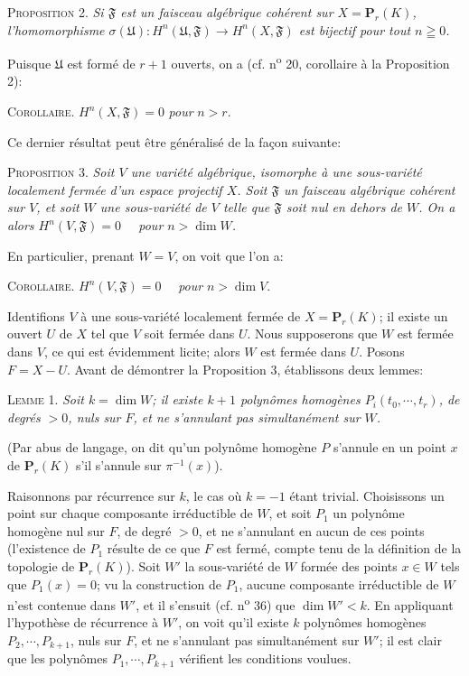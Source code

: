\textsc{Proposition} 2. \textit{Si $\mathfrak{F}$ est un faisceau algébrique cohérent sur $X = \mathbf{P}_r(K)$, l'homomorphisme $\sigma(\mathfrak{U}) : H^n(\mathfrak{U}, \mathfrak{F}) \to H^n(X, \mathfrak{F})$ est bijectif pour tout $n \geqq 0$.}

Puisque $\mathfrak{U}$ est formé de $r + 1$ ouverts, on a (cf. n\textsuperscript{o} 20, corollaire à la Proposition 2):

\textsc{Corollaire}. $H^n(X, \mathfrak{F}) = 0$ \textit{pour} $n > r$.

Ce dernier résultat peut être généralisé de la façon suivante:

\textsc{Proposition} 3. \textit{Soit $V$ une variété algébrique, isomorphe à une sous-variété localement fermée d'un espace projectif $X$. Soit $\mathfrak{F}$ un faisceau algébrique cohérent sur $V$, et soit $W$ une sous-variété de $V$ telle que $\mathfrak{F}$ soit nul en dehors de $W$. On a alors $H^n(V, \mathfrak{F}) = 0$ \ \ pour $n > \dim W$.}

En particulier, prenant $W = V$, on voit que l'on a:

\textsc{Corollaire}. $H^n(V, \mathfrak{F}) = 0$ \ \ \textit{pour} $n > \dim V$.

Identifions $V$ à une sous-variété localement fermée de $X = \mathbf{P}_r(K)$; il existe un ouvert $U$ de $X$ tel que $V$ soit fermée dans $U$. Nous supposerons que $W$ est fermée dans $V$, ce qui est évidemment licite; alors $W$ est fermée dans $U$. Posons $F = X - U$. Avant de démontrer la Proposition 3, établissons deux lemmes:

\textsc{Lemme} 1. \textit{Soit $k = \dim W$; il existe $k + 1$ polynômes homogènes $P_i(t_0 , \cdots , t_r)$, de degrés $>0$, nuls sur $F$, et ne s'annulant pas simultanément sur $W$.}

(Par abus de langage, on dit qu'un polynôme homogène $P$ s'annule en un point $x$ de $\mathbf{P}_r(K)$ s'il s'annule sur $\pi^{-1}(x)$).

Raisonnons par récurrence sur $k$, le cas où $k = -1$ étant trivial. Choisissons un point sur chaque composante irréductible de $W$, et soit $P_1$ un polynôme homogène nul sur $F$, de degré $> 0$, et ne s'annulant en aucun de ces points (l'existence de $P_1$ résulte de ce que $F$ est fermé, compte tenu de la définition de la topologie de $\mathbf{P}_r(K)$). Soit $W'$ la sous-variété de $W$ formée des points $x \in W$ tels
que $P_1(x) = 0$; vu la construction de $P_1$, aucune composante irréductible de $W$ n'est contenue dans $W'$, et il s'ensuit (cf. n\textsuperscript{o} 36) que $\dim W' < k$. En appliquant l'hypothèse de récurrence à $W'$, on voit qu'il existe $k$ polynômes homogènes $P_2, \cdots, P_{k+1}$, nuls sur $F$, et ne s'annulant pas simultanément sur $W'$; il est clair que les polynômes $P_1, \cdots, P_{k+1}$ vérifient les conditions voulues.

